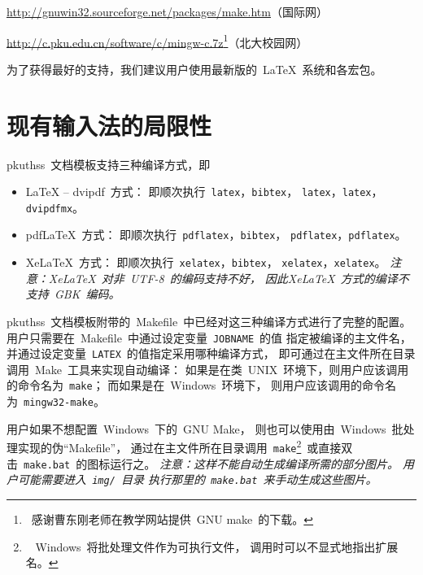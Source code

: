 	\url{http://gnuwin32.sourceforge.net/packages/make.htm}（国际网）
	\vspace{-0.1em}\par
	\url{http://c.pku.edu.cn/software/c/mingw-c.7z}\footnote%
	{\ 感谢曹东刚老师在教学网站提供~GNU make~的下载。}（北大校园网）

	为了获得最好的支持，我们建议用户使用最新版的~\LaTeX{}~系统和各宏包。

	\section{现有输入法的局限性}

	pkuthss~文档模板支持三种编译方式，即
	\begin{itemize}\denselist
	  \item \LaTeX{} -- dvipdf~方式：
		即顺次执行~\verb|latex|，\verb|bibtex|，%
		\verb|latex|，\verb|latex|，\verb|dvipdfmx|。
	  \item pdf\LaTeX{}~方式：
		即顺次执行~\verb|pdflatex|，\verb|bibtex|，%
		\verb|pdflatex|，\verb|pdflatex|。
	  \item Xe\LaTeX{}~方式：
		即顺次执行~\verb|xelatex|，\verb|bibtex|，%
		\verb|xelatex|，\verb|xelatex|。%
		\emph
		{%
			注意：Xe\LaTeX{}~对非~UTF-8~的编码支持不好，
			因此Xe\LaTeX{}~方式的编译不支持~GBK~编码。
		}
	\end{itemize}

	pkuthss~文档模板附带的~Makefile~中已经对这三种编译方式进行了完整的配置。
	用户只需要在~Makefile~中通过设定变量~\verb|JOBNAME|~的值%
	指定被编译的主文件名，
	并通过设定变量~\verb|LATEX|~的值指定采用哪种编译方式，
	即可通过在主文件所在目录调用~Make~工具来实现自动编译：
	如果是在类~UNIX~环境下，则用户应该调用的命令名为~\verb|make|；
	而如果是在~Windows~环境下，
	则用户应该调用的命令名为~\verb|mingw32-make|。

	用户如果不想配置~Windows~下的~GNU Make，
	则也可以使用由~Windows~批处理实现的伪“Makefile”，
	通过在主文件所在目录调用~\verb|make|\footnote%
	{\ %
		Windows~将批处理文件作为可执行文件，
		调用时可以不显式地指出扩展名。
	}~或直接双击~\verb|make.bat|~的图标运行之。%
	\emph
	{%
		注意：这样不能自动生成编译所需的部分图片。
		用户可能需要进入~\texttt{img/}~目录%
		执行那里的~\texttt{make.bat}~来手动生成这些图片。
	}

